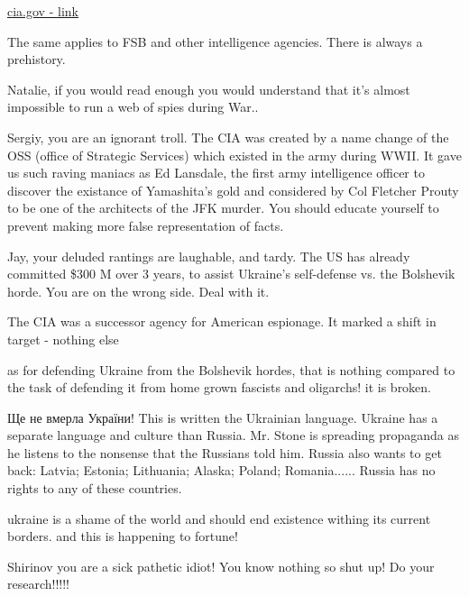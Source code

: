 \begin{itemize}
\begin{itemize}
\href{https://www.cia.gov/about-cia/history-of-the-cia}{%
cia.gov - link%
}

The same applies to FSB and other intelligence agencies. There is always a
prehistory.


Natalie, if you would read enough you would understand that it's almost impossible to run a web of spies during War..


Sergiy, you are an ignorant troll. The CIA was created by a name change of the
OSS (office of Strategic Services) which existed in the army during WWII. It
gave us such raving maniacs as Ed Lansdale, the first army intelligence officer
to discover the existance of Yamashita's gold and considered by Col Fletcher
Prouty to be one of the architects of the JFK murder. You should educate
yourself to prevent making more false representation of facts.


Jay, your deluded rantings are laughable, and tardy. The US has already
committed \$300 M over 3 years, to assist Ukraine's self-defense vs. the
Bolshevik horde. You are on the wrong side. Deal with it.


The CIA was a successor agency for American espionage. It marked a shift in
target - nothing else


as for defending Ukraine from the Bolshevik hordes, that is nothing compared to
the task of defending it from home grown fascists and oligarchs! it is broken.


Ще не вмерла України! This is written the Ukrainian language. Ukraine has a
separate language and culture than Russia. Mr. Stone is spreading propaganda as
he listens to the nonsense that the Russians told him. Russia also wants to get
back: Latvia; Estonia; Lithuania; Alaska; Poland; Romania...... Russia has no
rights to any of these countries.


ukraine is a shame of the world and should end existence withing its current
borders. and this is happening to fortune!


Shirinov you are a sick pathetic idiot! You know nothing so shut up!
Do your research!!!!!


\end{itemize}
\end{itemize}
